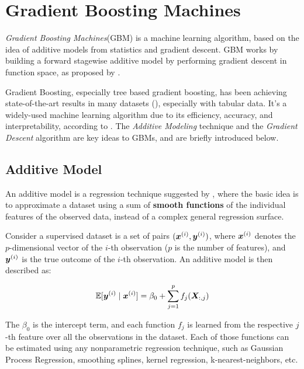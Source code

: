 \chapter{Gradient Boosting Machines}
\label{cap:boosting-intro}

\textit{Gradient Boosting Machines}(GBM) is a machine learning algorithm, based on the idea of additive models from statistics and gradient descent. GBM works by building a forward stagewise additive model by performing gradient descent in function space, as proposed by \cite{gbmdef}. 

Gradient Boosting, especially tree based gradient boosting, has been achieving state-of-the-art results in many datasets (\cite{li2012robust}), especially with tabular data. It's a widely-used machine learning algorithm due to its efficiency, accuracy, and interpretability, according to \cite{ke2017lightgbm}. The \textit{Additive Modeling} technique and the \textit{Gradient Descent} algorithm are key ideas to GBMs, and are briefly introduced below.

\section{Additive Model}
An additive model is a  regression technique suggested by , where the basic idea is to approximate a dataset using a sum of \textbf{smooth functions} of the individual features of the observed data, instead of a complex general regression surface.

Consider a supervised dataset is a set of pairs $(\bm{x}^{(i)},\bm{y}^{(i)})$, where $\bm{x}^{(i)}$ denotes the $p$-dimensional vector of the $i$-th observation ($p$ is the number of features), and $\bm{y}^{(i)}$ is the true outcome of the $i$-th observation. An additive model is then described as:

\begin{equation}\label{eq:additive}
\mathbb{E}[\bm{y}^{(i)}\mid \bm{x}^{(i)}] = \beta_0 + \sum_{j=1}^pf_j(\bm{X}_{:, j})
\end{equation}

The $\beta_0$ is the intercept term, and each function $f_j$ is learned from the respective $j$-th feature over all the observations in the dataset. Each of those functions can be estimated using any nonparametric regression technique, such as Gaussian Process Regression, smoothing splines, kernel regression, k-nearest-neighbors, etc.

